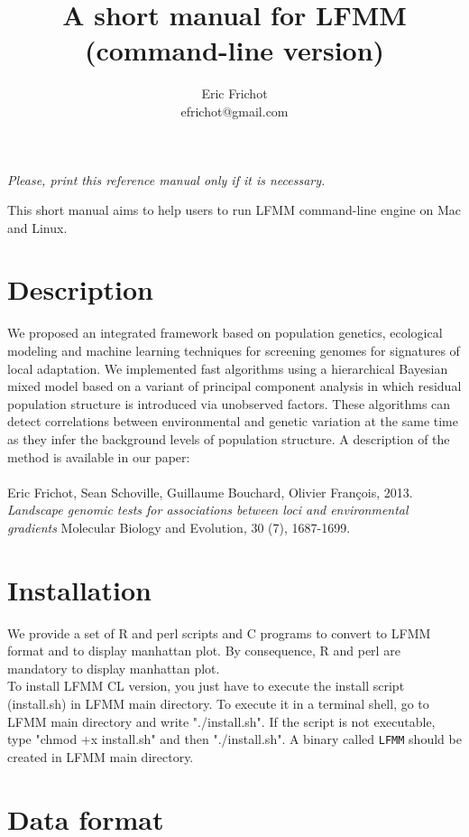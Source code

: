 \documentclass[10pt,a4paper]{article}
\title{\bf \Large A short manual for LFMM\\
\large (command-line version)
}
\author{
        Eric Frichot\\efrichot@gmail.com\\
}
\begin{document}
\maketitle
\begin{center}
{\it Please, print this reference manual only if it is necessary.}
\end{center}

\noindent
This short manual aims to help users to run LFMM command-line engine on Mac and Linux. 

\section{Description} 
We proposed an integrated framework based on population genetics, ecological modeling and machine 
learning techniques for screening genomes for signatures of local adaptation. We implemented fast 
algorithms using a hierarchical Bayesian mixed model based on a variant of principal component 
analysis in which residual population structure is introduced via unobserved factors. These 
algorithms can detect correlations between environmental and genetic variation at the same time 
as they infer the background levels of population structure. A description of the method is available in our paper:
\\
\\
\noindent
Eric Frichot, Sean Schoville, Guillaume Bouchard, Olivier François, 2013. {\it Landscape genomic tests for associations between loci and environmental gradients} Molecular Biology and Evolution, 30 (7), 1687-1699. 

\section{Installation} 

We provide a set of R and perl scripts and C programs to convert to LFMM format and to display manhattan plot.
By consequence, R and perl are  mandatory to display manhattan plot. 
\\
\noindent
To install LFMM CL version, you just have to execute the install script (install.sh) 
in LFMM main directory.
To execute it in a terminal shell, go to LFMM main directory and write "./install.sh".
If the script is not executable, type "chmod +x install.sh" and then "./install.sh".
A binary called \verb|LFMM| should be created in LFMM main directory.

\section{Data format}
\end{document}
